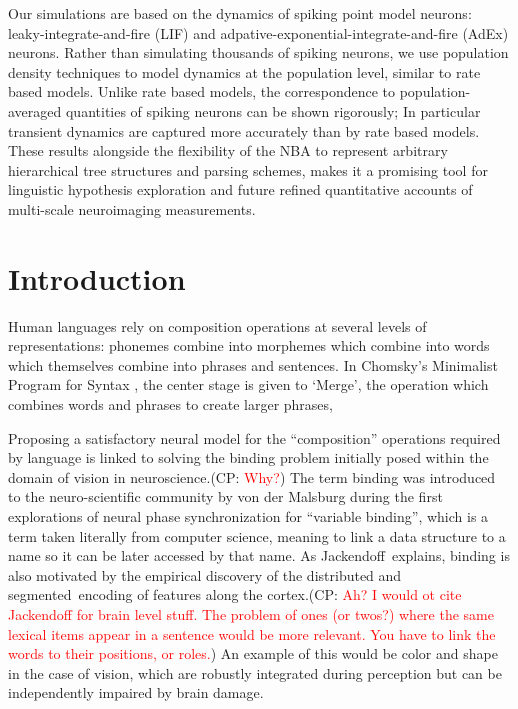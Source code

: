 \documentclass[10pt]{article}
\newcommand{\noteCP}[1]{(CP: \textcolor{red}{#1})}
\begin{document}
Our simulations are based on the dynamics of spiking point model neurons: leaky-integrate-and-fire (LIF) and adpative-exponential-integrate-and-fire (AdEx) neurons.
Rather than simulating thousands of spiking neurons, we use population density techniques to model dynamics at the population level, similar to rate based models.
Unlike rate based models, the correspondence to population-averaged quantities of spiking neurons can be shown rigorously; 
In particular transient dynamics are captured more accurately than by rate based models.
These results alongside the flexibility of the NBA to represent arbitrary hierarchical tree structures and parsing schemes, makes it a promising tool for linguistic hypothesis exploration and future refined quantitative accounts of multi-scale neuroimaging measurements.


\section{Introduction}

{\label{931947}}

Human languages rely on composition operations at several levels of representations: phonemes combine into morphemes which combine into words which themselves combine into phrases and sentences.
In Chomsky's Minimalist Program for Syntax \cite{Chomsky_2013}, the center stage is given to `Merge', the operation which combines words and phrases to create larger phrases, 

Proposing a satisfactory neural model for the ``composition'' operations required by language is linked to solving the binding problem initially posed within the domain of vision in neuroscience.\noteCP{Why?}
The term binding was introduced to the neuro-scientific community by von der Malsburg\cite{von_der_Malsburg_1994} during the first explorations of neural phase synchronization for ``variable binding'', which is a term taken literally from computer science, meaning to link a data structure to a name so it can be later accessed by that name.
As Jackendoff\cite{Jackendoff_2002b}~explains, binding is also motivated by the empirical discovery of the distributed and segmented~encoding of features along the cortex.\noteCP{Ah? I would ot cite Jackendoff for brain level stuff. The problem of ones (or twos?) where the same lexical items appear in a sentence would be more relevant. You have to link the words to their positions, or roles.}
An example of this would be color and shape in the case of vision, which are robustly integrated during perception but can be independently impaired by brain damage.
\end{document}
